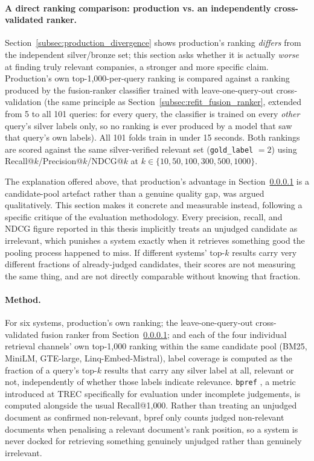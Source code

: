 \documentclass[a4paper,oneside,bibliography=totoc]{scrbook}
\begin{document}
\paragraph{A direct ranking comparison: production vs. an independently cross-validated ranker.}
\label{subsec:goi_vs_ours_ranking}

Section~\ref{subsec:production_divergence} shows production's ranking \emph{differs} from the independent silver/bronze set; this section asks whether it is actually \emph{worse} at finding truly relevant companies, a stronger and more specific claim. Production's own top-1{,}000-per-query ranking is compared against a ranking produced by the fusion-ranker classifier trained with leave-one-query-out cross-validation (the same principle as Section~\ref{subsec:refit_fusion_ranker}, extended from 5 to all 101 queries: for every query, the classifier is trained on every \emph{other} query's silver labels only, so no ranking is ever produced by a model that saw that query's own labels). All 101 folds train in under 15 seconds. Both rankings are scored against the same silver-verified relevant set (\texttt{gold\_label} $=2$) using Recall@$k$/Precision@$k$/NDCG@$k$ at $k \in \{10, 50, 100, 300, 500, 1000\}$.

\label{subsec:label_coverage_bpref}

The explanation offered above, that production's advantage in Section~\ref{subsec:goi_vs_ours_ranking} is a candidate-pool artefact rather than a genuine quality gap, was argued qualitatively. This section makes it concrete and measurable instead, following a specific critique of the evaluation methodology. Every precision, recall, and NDCG figure reported in this thesis implicitly treats an unjudged candidate as irrelevant, which punishes a system exactly when it retrieves something good the pooling process happened to miss. If different systems' top-$k$ results carry very different fractions of already-judged candidates, their scores are not measuring the same thing, and are not directly comparable without knowing that fraction.

\paragraph{Method.} For six systems, production's own ranking; the leave-one-query-out cross-validated fusion ranker from Section~\ref{subsec:goi_vs_ours_ranking}; and each of the four individual retrieval channels' own top-1{,}000 ranking within the same candidate pool (BM25, MiniLM, GTE-large, Linq-Embed-Mistral), label coverage is computed as the fraction of a query's top-$k$ results that carry any silver label at all, relevant or not, independently of whether those labels indicate relevance. \texttt{bpref} \citep{buckley2004retrieval}, a metric introduced at TREC specifically for evaluation under incomplete judgements, is computed alongside the usual Recall@1{,}000. Rather than treating an unjudged document as confirmed non-relevant, bpref only counts judged non-relevant documents when penalising a relevant document's rank position, so a system is never docked for retrieving something genuinely unjudged rather than genuinely irrelevant.
\end{document}
